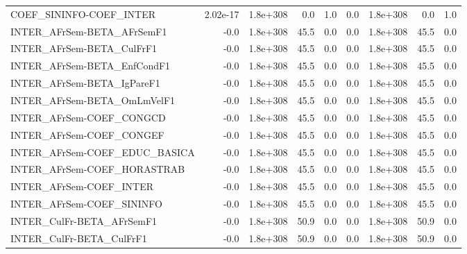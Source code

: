 \begin{tabular}{lrrrrrrrr}
COEF\_SININFO-COEF\_INTER               &    2.02e-17 &     1.8e+308 &     0.0 &      1.0 &        0.0 &    1.8e+308 &          0.0 &           1.0 \\
INTER\_AFrSem-BETA\_AFrSemF1            &        -0.0 &     1.8e+308 &    45.5 &      0.0 &        0.0 &    1.8e+308 &         45.5 &           0.0 \\
INTER\_AFrSem-BETA\_CulFrF1             &        -0.0 &     1.8e+308 &    45.5 &      0.0 &        0.0 &    1.8e+308 &         45.5 &           0.0 \\
INTER\_AFrSem-BETA\_EnfCondF1           &        -0.0 &     1.8e+308 &    45.5 &      0.0 &        0.0 &    1.8e+308 &         45.5 &           0.0 \\
INTER\_AFrSem-BETA\_IgPareF1            &        -0.0 &     1.8e+308 &    45.5 &      0.0 &        0.0 &    1.8e+308 &         45.5 &           0.0 \\
INTER\_AFrSem-BETA\_OmLmVelF1           &        -0.0 &     1.8e+308 &    45.5 &      0.0 &        0.0 &    1.8e+308 &         45.5 &           0.0 \\
INTER\_AFrSem-COEF\_CONGCD              &        -0.0 &     1.8e+308 &    45.5 &      0.0 &        0.0 &    1.8e+308 &         45.5 &           0.0 \\
INTER\_AFrSem-COEF\_CONGEF              &        -0.0 &     1.8e+308 &    45.5 &      0.0 &        0.0 &    1.8e+308 &         45.5 &           0.0 \\
INTER\_AFrSem-COEF\_EDUC\_BASICA         &        -0.0 &     1.8e+308 &    45.5 &      0.0 &        0.0 &    1.8e+308 &         45.5 &           0.0 \\
INTER\_AFrSem-COEF\_HORASTRAB           &        -0.0 &     1.8e+308 &    45.5 &      0.0 &        0.0 &    1.8e+308 &         45.5 &           0.0 \\
INTER\_AFrSem-COEF\_INTER               &        -0.0 &     1.8e+308 &    45.5 &      0.0 &        0.0 &    1.8e+308 &         45.5 &           0.0 \\
INTER\_AFrSem-COEF\_SININFO             &        -0.0 &     1.8e+308 &    45.5 &      0.0 &        0.0 &    1.8e+308 &         45.5 &           0.0 \\
INTER\_CulFr-BETA\_AFrSemF1             &        -0.0 &     1.8e+308 &    50.9 &      0.0 &        0.0 &    1.8e+308 &         50.9 &           0.0 \\
INTER\_CulFr-BETA\_CulFrF1              &        -0.0 &     1.8e+308 &    50.9 &      0.0 &        0.0 &    1.8e+308 &         50.9 &           0.0 \\

\end{tabular}
